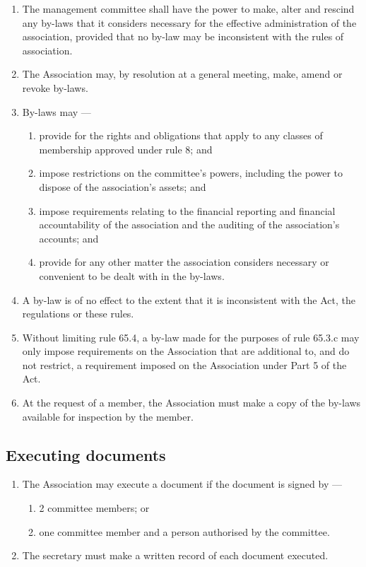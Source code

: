 \documentclass[../constitution.tex]{subfiles}
\begin{document}
\begin{enumerate}

\item The management committee shall have the power to make, alter and rescind any by-laws that it considers necessary for the effective administration of the association, provided that no by-law may be inconsistent with the rules of association.
\item The Association may, by resolution at a general meeting, make, amend or revoke by-laws.
\item By-laws may ---

  \begin{enumerate}
  
  \item provide for the rights and obligations that apply to any classes of membership approved under rule 8; and
  \item impose restrictions on the committee's powers, including the power to dispose of the association's assets; and
  \item impose requirements relating to the financial reporting and financial accountability of the association and the auditing of the association's accounts; and
  \item provide for any other matter the association considers necessary or convenient to be dealt with in the by-laws.
  \end{enumerate}
\item A by-law is of no effect to the extent that it is inconsistent with the Act, the regulations or these rules.
\item Without limiting rule 65.4, a by-law made for the purposes of rule 65.3.c may only impose requirements on the Association that are additional to, and do not restrict, a requirement imposed on the Association under Part 5 of the Act.
\item At the request of a member, the Association must make a copy of the by-laws available for inspection by the member.
\end{enumerate}

\hypertarget{executing-documents}{%
\subsection{Executing documents}\label{executing-documents}}

\begin{enumerate}

\item The Association may execute a document if the document is signed by ---

  \begin{enumerate}
  
  \item 2 committee members; or
  \item one committee member and a person authorised by the committee.
  \end{enumerate}
\item The secretary must make a written record of each document executed.
\end{enumerate}
\end{document}
